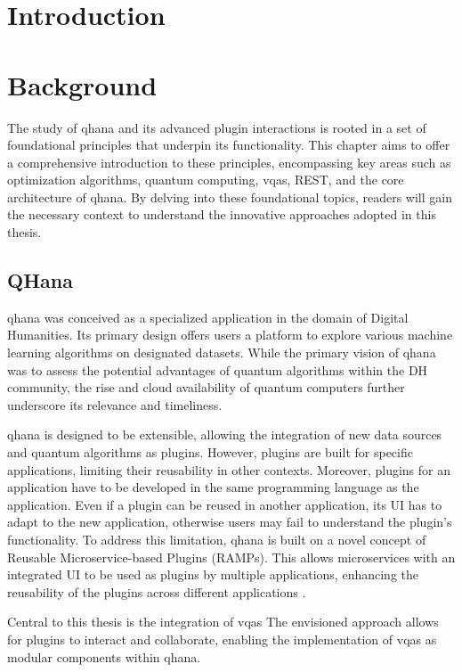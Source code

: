 \documentclass[
  a4paper,  %
  twoside,  %
  bibliography=totoc,
  headsepline,
  cleardoublepage=empty,
  parskip=half,
  draft=false
]{scrbook}
\begin{document}
\chapter{Introduction}
\label{chap:introduction}

\chapter{Background}
\label{chap:background}

The study of \gls{qhana} and its advanced plugin interactions is rooted in a set of foundational principles that underpin its functionality.
This chapter aims to offer a comprehensive introduction to these principles, encompassing key areas such as optimization algorithms, quantum computing, \glspl{vqa}, REST, and the core architecture of \gls{qhana}.
By delving into these foundational topics, readers will gain the necessary context to understand the innovative approaches adopted in this thesis.

\section{QHana}
\label{sec:qhana}

\gls{qhana} was conceived as a specialized application in the domain of Digital Humanities.
Its primary design offers users a platform to explore various machine learning algorithms on designated datasets.
While the primary vision of \gls{qhana} was to assess the potential advantages of quantum algorithms within the DH community, the rise and cloud availability of quantum computers further underscore its relevance and timeliness.

\gls{qhana} is designed to be extensible, allowing the integration of new data sources and quantum algorithms as plugins.
However, plugins are built for specific applications, limiting their reusability in other contexts.
Moreover, plugins for an application have to be developed in the same programming language as the application.
Even if a plugin can be reused in another application, its UI has to adapt to the new application, otherwise users may fail to understand the plugin's functionality.
To address this limitation, \gls{qhana} is built on a novel concept of Reusable Microservice-based Plugins (RAMPs).
This allows microservices with an integrated UI to be used as plugins by multiple applications, enhancing the reusability of the plugins across different applications \cite{Buehler2022}.

Central to this thesis is the integration of \glspl{vqa}
The envisioned approach allows for plugins to interact and collaborate, enabling the implementation of \glspl{vqa} as modular components within \gls{qhana}.
\end{document}
